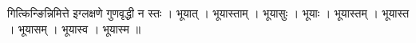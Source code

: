 गित्किन्ङिन्निमित्ते इग्लक्षणे गुणवृद्धी न स्तः । भूयात् । भूयास्ताम् ।
भूयासुः । भूयाः । भूयास्तम् । भूयास्त । भूयासम् । भूयास्व । भूयास्म ॥

